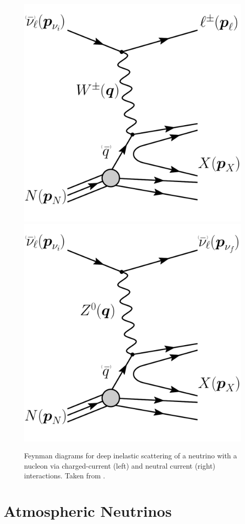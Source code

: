 \begin{figure}[h]
    \centering
    \includegraphics[width=0.4\linewidth]{figures/feynman_DIS_CC_nu_new.pdf}
    \hspace{0.8cm}
    \includegraphics[width=0.4\linewidth]{figures/feynman_DIS_NC_nu_new.pdf}
    \caption[Neutrino-nucleon deep inelastic scattering, taken from \cite{ATerliuk}]{Feynman diagrams for deep inelastic scattering of a neutrino with a nucleon via charged-current (left) and neutral current (right) interactions. Taken from \cite{ATerliuk}.}
    \label{fig:dis_feynman}
\end{figure}


\section{Atmospheric Neutrinos} \label{sec:neutrino_atmospheric}

